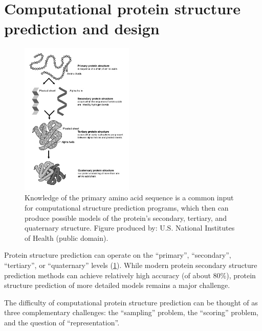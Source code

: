 \section{Computational protein structure prediction and design}

\begin{figure}
  \centering
  \includegraphics[width=0.48\textwidth,keepaspectratio]{figures/protein-structure.png}
  \caption[Protein sequence/structure]{Knowledge of the primary amino acid sequence is a common input for computational structure prediction programs, which then can produce possible models of the protein's secondary, tertiary, and quaternary structure. Figure produced by: U.S. National Institutes of Health (public domain).}
  \label{fig:protein-structure}
  \vspace{-12pt}
\end{figure}

Protein structure prediction can operate on the ``primary'', ``secondary'', ``tertiary'', or ``quaternary'' levels (\cref{fig:protein-structure}).
While modern protein secondary structure prediction methods can achieve relatively high accuracy (of about 80\%\cite{pirovano_protein_2010}), protein structure prediction of more detailed models remains a major challenge.

The difficulty of computational protein structure prediction can be thought of as three complementary challenges: the ``sampling'' problem, the ``scoring'' problem, and the question of ``representation''.

